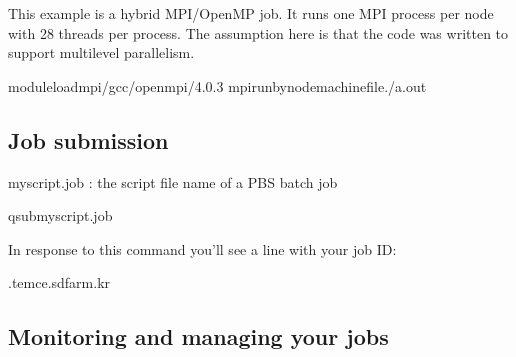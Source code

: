 \documentclass[a4paper,11pt,english]{sphinxmanual}
\begin{document}
\subsubsection{}
\label{\detokenize{guide:parallel-job-with-mpi-and-openmp}}
\sphinxAtStartPar
This example is a hybrid MPI/OpenMP job. It runs one MPI process per node with 28 threads per process. The assumption here is that the code was written to support multi\sphinxhyphen{}level parallelism.

\begin{sphinxVerbatim}[commandchars=\\\{\}]

moduleloadmpi/gcc/openmpi/4.0.3
mpirun\PYGZhy{}\PYGZhy{}bynode\PYGZhy{}machinefile./a.out
\end{sphinxVerbatim}


\subsection{Job submission}
\label{\detokenize{guide:job-submission}}
\sphinxAtStartPar
myscript.job : the script file name of a PBS batch job

\begin{sphinxVerbatim}[commandchars=\\\{\}]
\PYGZdl{}\PYGZgt{}qsubmyscript.job
\end{sphinxVerbatim}

\sphinxAtStartPar
In response to this command you’ll see a line with your job ID:

\begin{sphinxVerbatim}[commandchars=\\\{\}]
.tem\PYGZhy{}ce.sdfarm.kr
\end{sphinxVerbatim}


\subsection{Monitoring and managing your jobs}
\label{\detokenize{guide:monitoring-and-managing-your-jobs}}
\end{document}
